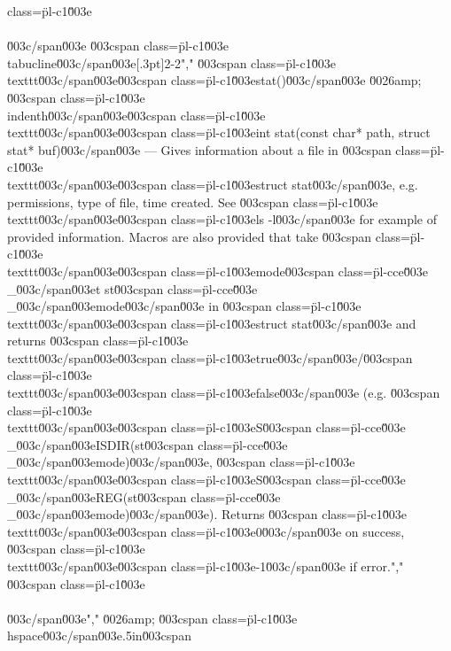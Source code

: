 class=\"pl-c1\"\u003e\\\\\u003c/span\u003e \u003cspan class=\"pl-c1\"\u003e\\tabucline\u003c/span\u003e[.3pt]{2-2}","    \u003cspan class=\"pl-c1\"\u003e\\texttt\u003c/span\u003e{\u003cspan class=\"pl-c1\"\u003estat()\u003c/span\u003e} \u0026amp; \u003cspan class=\"pl-c1\"\u003e\\indenth\u003c/span\u003e\u003cspan class=\"pl-c1\"\u003e\\texttt\u003c/span\u003e{\u003cspan class=\"pl-c1\"\u003eint stat(const char* path,  struct stat* buf)\u003c/span\u003e} --- Gives information about a file in \u003cspan class=\"pl-c1\"\u003e\\texttt\u003c/span\u003e{\u003cspan class=\"pl-c1\"\u003estruct stat\u003c/span\u003e}, e.g. permissions, type of file, time created. See \u003cspan class=\"pl-c1\"\u003e\\texttt\u003c/span\u003e{\u003cspan class=\"pl-c1\"\u003els -l\u003c/span\u003e} for example of provided information. Macros are also provided that take \u003cspan class=\"pl-c1\"\u003e\\texttt\u003c/span\u003e{\u003cspan class=\"pl-c1\"\u003emode\u003cspan class=\"pl-cce\"\u003e\\_\u003c/span\u003et st\u003cspan class=\"pl-cce\"\u003e\\_\u003c/span\u003emode\u003c/span\u003e} in \u003cspan class=\"pl-c1\"\u003e\\texttt\u003c/span\u003e{\u003cspan class=\"pl-c1\"\u003estruct stat\u003c/span\u003e} and returns \u003cspan class=\"pl-c1\"\u003e\\texttt\u003c/span\u003e{\u003cspan class=\"pl-c1\"\u003etrue\u003c/span\u003e}/\u003cspan class=\"pl-c1\"\u003e\\texttt\u003c/span\u003e{\u003cspan class=\"pl-c1\"\u003efalse\u003c/span\u003e} (e.g. \u003cspan class=\"pl-c1\"\u003e\\texttt\u003c/span\u003e{\u003cspan class=\"pl-c1\"\u003eS\u003cspan class=\"pl-cce\"\u003e\\_\u003c/span\u003eISDIR(st\u003cspan class=\"pl-cce\"\u003e\\_\u003c/span\u003emode)\u003c/span\u003e}, \u003cspan class=\"pl-c1\"\u003e\\texttt\u003c/span\u003e{\u003cspan class=\"pl-c1\"\u003eS\u003cspan class=\"pl-cce\"\u003e\\_\u003c/span\u003eREG(st\u003cspan class=\"pl-cce\"\u003e\\_\u003c/span\u003emode)\u003c/span\u003e}). Returns \u003cspan class=\"pl-c1\"\u003e\\texttt\u003c/span\u003e{\u003cspan class=\"pl-c1\"\u003e0\u003c/span\u003e} on success, \u003cspan class=\"pl-c1\"\u003e\\texttt\u003c/span\u003e{\u003cspan class=\"pl-c1\"\u003e-1\u003c/span\u003e} if error.","        \u003cspan class=\"pl-c1\"\u003e\\\\\u003c/span\u003e","    \u0026amp; \u003cspan class=\"pl-c1\"\u003e\\hspace\u003c/span\u003e{.5in}\u003cspan 